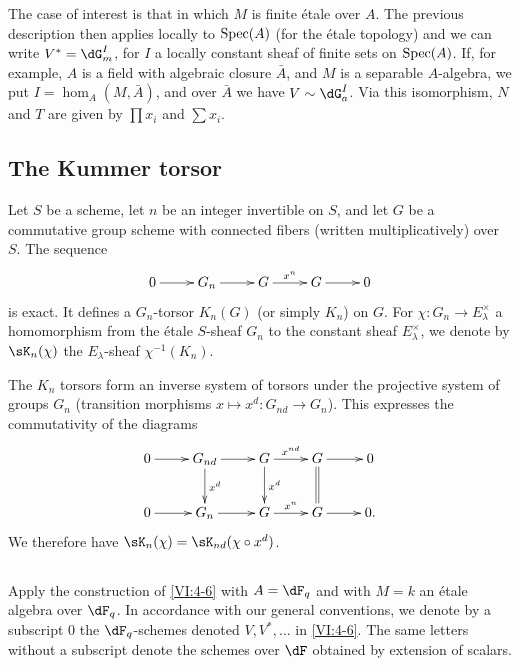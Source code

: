 The case of interest is that in which $M$ is finite étale over $A$. The 
previous description then applies locally to $\operatorname{Spec}(A)$ (for the 
étale topology) and we can write $V^\ast=\dG_m^I$, for $I$ a locally 
constant sheaf of finite sets on $\operatorname{Spec}(A)$. If, for example, $A$ is a 
field with algebraic closure $\bar A$, and $M$ is a separable $A$-algebra, 
we put $I=\hom_A(M,\bar A)$, and over $\bar A$ we have 
$V\sim \dG_a^I$. Via this isomorphism, $N$ and $T$ are given by $\prod x_i$ and 
$\sum x_i$. 





\subsection{The Kummer torsor}\label{VI:4-7}

Let $S$ be a scheme, let $n$ be an integer invertible on $S$, and let $G$ be a 
commutative group scheme with connected fibers (written multiplicatively) over $S$. 
The sequence 
\[\xymatrix{
  0 \ar[r] 
    & G_n \ar[r] 
    & G \ar[r]^-{x^n} 
    & G \ar[r] 
    & 0 
}\]
is exact. It defines a $G_n$-torsor $K_n(G)$ (or simply $K_n$) on 
$G$. For $\chi:G_n \to E_\lambda^\times$ a homomorphism from the étale 
$S$-sheaf $G_n$ to the constant sheaf $E_\lambda^\times$, we denote by 
$\sK_n(\chi)$ the $E_\lambda$-sheaf $\chi^{-1}(K_n)$. 

The $K_n$ torsors form an inverse system of torsors under the 
projective system of groups $G_n$ (transition morphisms 
$x\mapsto x^d:G_{n d}\to G_n$). This expresses the commutativity of the diagrams 
\[\xymatrix{
  0 \ar[r] 
    & G_{n d} \ar[r] \ar[d]^-{x^d} 
    & G \ar[r]^-{x^{n d}} \ar[d]^-{x^d} 
    & G \ar[r] \ar@{=}[d] 
    & 0 \\
  0 \ar[r] 
    & G_n \ar[r] 
    & G \ar[r]^-{x^n} 
    & G \ar[r] 
    & 0 \text{.} 
}\]
We therefore have $\sK_n(\chi) = \sK_{n d}(\chi\circ x^d)$. 





\subsection{}\label{VI:4-8}

Apply the construction of \ref{VI:4-6} with $A=\dF_q$ and with $M=k$ an 
étale algebra over $\dF_q$. In accordance with our general conventions, we denote 
by a subscript $0$ the $\dF_q$-schemes denoted $V,V^\ast,\ldots$ in 
\ref{VI:4-6}. The same letters without a subscript denote the schemes over 
$\dF$ obtained by extension of scalars. 

